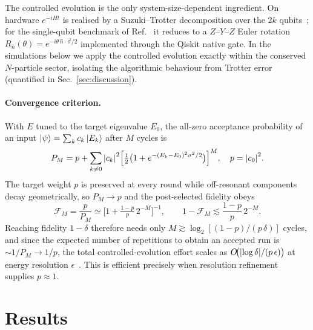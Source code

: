 \documentclass[11pt]{article}
\begin{document}
The controlled evolution is the only system-size-dependent ingredient.  On hardware
$e^{-iH t}$ is realised by a Suzuki--Trotter decomposition over the $2k$
qubits~\cite{Trotter1959,Suzuki1976,Childs2021}; for the single-qubit benchmark of
Ref.~\cite{Qian2024} it reduces to a $Z$--$Y$--$Z$ Euler rotation
$R_{\hat n}(\theta)=e^{-i\theta\,\hat n\cdot\vec\sigma/2}$ implemented through the
Qiskit native gate.  In the simulations below we apply the controlled evolution
exactly within the conserved $N$-particle sector, isolating the algorithmic behaviour
from Trotter error (quantified in Sec.~\ref{sec:discussion}).

\paragraph{Convergence criterion.}
With $E$ tuned to the target eigenvalue $E_0$, the all-zero acceptance probability of
an input $\ket{\psi}=\sum_k c_k\ket{E_k}$ after $M$ cycles is
\begin{equation}
  P_M=p+\sum_{k\neq0}\abs{c_k}^2
  \Big[\tfrac12\big(1+e^{-(E_k-E_0)^2\sigma^2/2}\big)\Big]^{M},
  \quad p=\abs{c_0}^2 .
  \label{eq:PM}
\end{equation}
The target weight $p$ is preserved at every round while off-resonant components decay
geometrically, so $P_M\to p$ and the post-selected fidelity obeys
\begin{equation}
  \mathcal{F}_M=\frac{p}{P_M}\simeq\Big[1+\tfrac{1-p}{p}\,2^{-M}\Big]^{-1},
  \qquad
  1-\mathcal{F}_M\lesssim\frac{1-p}{p}\,2^{-M}.
  \label{eq:fid}
\end{equation}
Reaching fidelity $1-\delta$ therefore needs only
$M\gtrsim\log_2[(1-p)/(p\,\delta)]$ cycles, and since the expected number of
repetitions to obtain an accepted run is $\sim 1/P_M\to 1/p$, the total
controlled-evolution effort scales as $O\!\big(\abs{\log\delta}/(p\,\epsilon)\big)$
at energy resolution $\epsilon$~\cite{Choi2021}.  This is efficient precisely when
resolution refinement supplies $p\approx 1$.

\section{Results}
\end{document}
